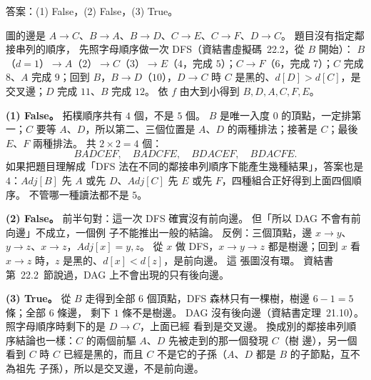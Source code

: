 \begin{pastsoln}
答案：(1) False，(2) False，(3) True。

圖的邊是 $A \to C$、$B \to A$、$B \to D$、$C \to E$、$C \to F$、$D \to C$。 題目沒有指定鄰接串列的順序，
先照字母順序做一次 DFS（資結書虛擬碼~22.2，從 $B$ 開始）：
$B$（$d = 1$）$\to A$（$2$）$\to C$（$3$）$\to E$（$4$，完成 $5$）；$C \to F$（$6$，完成 $7$）；$C$ 完成
$8$、$A$ 完成 $9$；回到 $B$，$B \to D$（$10$），$D \to C$ 時 $C$ 是黑的、$d[D] > d[C]$，是交叉邊；$D$ 完成
$11$、$B$ 完成 $12$。 依 $f$ 由大到小得到 $B, D, A, C, F, E$。

\textbf{(1) False。} 拓樸順序共有 $4$ 個，不是 $5$ 個。 $B$ 是唯一入度 $0$ 的頂點，一定排第一；$C$ 要等
$A$、$D$，所以第二、三個位置是 $A$、$D$ 的兩種排法；接著是 $C$；最後 $E$、$F$ 兩種排法。 共
$2 \times 2 = 4$ 個：
\[
BADCEF,\quad BADCFE,\quad BDACEF,\quad BDACFE.
\]
如果把題目理解成「DFS 法在不同的鄰接串列順序下能產生幾種結果」，答案也是 $4$：$\mathit{Adj}[B]$ 先
$A$ 或先 $D$、$\mathit{Adj}[C]$ 先 $E$ 或先 $F$，四種組合正好得到上面四個順序。 不管哪一種讀法都不是
$5$。

\textbf{(2) False。} 前半句對：這一次 DFS 確實沒有前向邊。 但「所以 DAG 不會有前向邊」不成立，一個例
子不能推出一般的結論。 反例：三個頂點，邊 $x \to y$、$y \to z$、$x \to z$，$\mathit{Adj}[x] = y, z$。
從 $x$ 做 DFS，$x \to y \to z$ 都是樹邊；回到 $x$ 看 $x \to z$ 時，$z$ 是黑的、$d[x] < d[z]$，是前向邊。 這
張圖沒有環。 資結書第~22.2~節說過，DAG 上不會出現的只有後向邊。

\textbf{(3) True。} 從 $B$ 走得到全部 $6$ 個頂點，DFS 森林只有一棵樹，樹邊 $6 - 1 = 5$ 條；全部 $6$ 條邊，
剩下 $1$ 條不是樹邊。 DAG 沒有後向邊（資結書定理~21.10）。 照字母順序時剩下的是 $D \to C$，上面已經
看到是交叉邊。 換成別的鄰接串列順序結論也一樣：$C$ 的兩個前驅 $A$、$D$ 先被走到的那一個發現 $C$（樹
邊），另一個看到 $C$ 時 $C$ 已經是黑的，而且 $C$ 不是它的子孫（$A$、$D$ 都是 $B$ 的子節點，互不為祖先
子孫），所以是交叉邊，不是前向邊。
\end{pastsoln}
